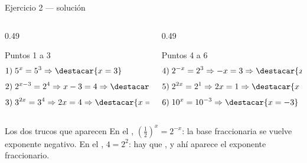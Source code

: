 \documentclass[aspectratio=169,10pt]{beamer}
\begin{document}
\begin{frame}{Ejercicio 2 — solución}
  \tiny
  \begin{columns}[T,onlytextwidth]
    \begin{column}{0.49\textwidth}
      \begin{block}{Puntos 1 a 3}
        \tiny
        \begin{align*}
          1)\;& 5^{x}=5^{3} \Rightarrow \destacar{x=3} \\[0.3em]
          2)\;& 2^{x-3}=2^{4} \Rightarrow x-3=4 \Rightarrow
                \destacar{x=7} \\[0.3em]
          3)\;& 3^{2x}=3^{4} \Rightarrow 2x=4 \Rightarrow \destacar{x=2}
        \end{align*}
      \end{block}
    \end{column}
    \begin{column}{0.49\textwidth}
      \begin{block}{Puntos 4 a 6}
        \tiny
        \begin{align*}
          4)\;& 2^{-x}=2^{3} \Rightarrow -x=3 \Rightarrow
                \destacar{x=-3} \\[0.3em]
          5)\;& 2^{2x}=2^{1} \Rightarrow 2x=1 \Rightarrow
                \destacar{x=\tfrac{1}{2}} \\[0.3em]
          6)\;& 10^{x}=10^{-3} \Rightarrow \destacar{x=-3}
        \end{align*}
      \end{block}
    \end{column}
  \end{columns}

  \vspace{0.1cm}
  \begin{alertblock}{Los dos trucos que aparecen}
    \tiny
    En el , $\left(\tfrac{1}{2}\right)^{x} = 2^{-x}$: la base
    fraccionaria se vuelve exponente negativo. \quad
    En el , $4 = 2^{2}$: hay que , y ahí aparece el exponente fraccionario.
  \end{alertblock}
\end{frame}
\end{document}
